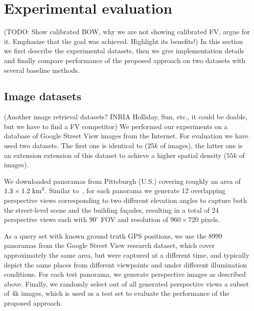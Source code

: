 \documentclass[table]{article} %
\begin{document}


\section{Experimental evaluation}
\label{sec:exp}
	\textcolor{myRed}{(TODO: Show calibrated BOW, why we are not showing calibrated FV, argue for it. Emphasize that the goal was achieved. Highlight its benefits!)}
	In this section we first describe the experimental datasets, then we give implementation details and finally compare performance of the proposed approach on two datasets with several baseline methods.

   	\subsection{Image datasets}
   		\textcolor{myRed}{(Another image retrieval datasets? INRIA Holliday, Sun, etc., it could be doable, but we have to find a FV competitor)}\newline
		We performed our experiments on a database of Google Street View images from the Internet. For evaluation we have used two datasets. The first one is identical to \cite{Gronat2013, Torii2011} ($25k$ of images), the latter one is an extension extension of this dataset to achieve a higher spatial density ($55k$ of images).

		We downloaded panoramas from Pittsburgh (U.S.) covering roughly an area of $1.3 \times 1.2 \; {\rm km}^2$. Similar to~\cite{Chen11}, for each panorama we generate 12 overlapping perspective views corresponding to two different elevation angles to capture both the street-level scene and the building fa\c{c}ades, resulting in a total of 24 perspective views each with $90^\circ$ FOV and resolution of $960 \times 720$ pixels.

		As a query set with known ground truth GPS positions, we use the 8999 panoramas from the Google Street View research dataset, which cover approximately the same area, but were captured at a different time, and typically depict the same places from different viewpoints and under different illumination conditions. For each test panorama, we generate perspective images as described above. Finally, we randomly select out of all generated perspective views a subset of 4k images, which is used as a test set to evaluate the performance of the proposed approach.
\end{document}
